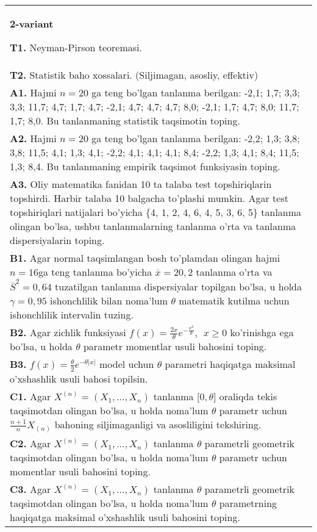 \documentclass{article}
\begin{document}
\begin{tabular}{m{17cm}}
\end{tabular}
\vspace{1cm}


\begin{tabular}{m{17cm}}
\textbf{2-variant}
\newline

\textbf{T1.} 
Neyman-Pirson teoremasi.
\\
\textbf{T2.} 
Statistik baho xossalari. (Siljimagan, asosliy, effektiv)
\\
\textbf{A1.} 
Hajmi \(n = 20\) ga teng bo'lgan tanlanma berilgan: -2,1; 1,7; 3,3; 3,3; 11,7; 4,7; 1,7; 4,7; -2,1; 4,7; 4,7; 4,7; 8,0; -2,1; 1,7; 4,7; 8,0; 11,7; 1,7; 8,0. Bu tanlanmaning statistik taqsimotin toping.
\\
\textbf{A2.} 
Hajmi \(n = 20\) ga teng bo'lgan tanlanma berilgan: -2,2; 1,3; 3,8; 3,8; 11,5; 4,1; 1,3; 4,1; -2,2; 4,1; 4,1; 4,1; 8,4; -2,2; 1,3; 4,1; 8,4; 11,5; 1,3; 8,4. Bu tanlanmaning empirik taqsimot funksiyasin toping.
\\
\textbf{A3.} 
Oliy matematika fanidan 10 ta talaba test topshiriqlarin topshirdi. Harbir talaba 10 balgacha to'plashi mumkin. Agar test topshiriqlari natijalari bo'yicha \{4, 1, 2, 4, 6, 4, 5, 3, 6, 5\} tanlanma olingan bo'lsa, ushbu tanlanmalarning tanlanma o'rta va tanlanma dispersiyalarin toping.
\\
\textbf{B1.} 
Agar normal taqsimlangan bosh to'plamdan olingan hajmi \(n = 16\)ga teng tanlanma bo'yicha \(\overline{x} = 20,2\) tanlanma o'rta va \({\overline{S}}^{2} = 0,64\) tuzatilgan tanlanma dispersiyalar topilgan bo'lsa, u holda \(\gamma = 0,95\) ishonchlilik bilan noma'lum \(\theta\) matematik kutilma uchun ishonchlilik intervalin tuzing.
\\
\textbf{B2.} 
Agar zichlik funksiyasi \(f(x) = \frac{2x}{\theta}e^{- \frac{x^{2}}{\theta}},\ \ x \geq 0\) ko'rinishga ega bo'lsa, u holda \(\theta\) parametr momentlar usuli bahosini toping.
\\
\textbf{B3.} 
\(f(x) = \frac{\theta}{2}e^{- \theta|x|}\) model uchun \(\theta\) parametri haqiqatga maksimal o'xshashlik usuli bahosi topilsin.
\\
\textbf{C1.} 
Agar \(X^{(n)} = \left( X_{1},...,X_{n} \right)\) tanlanma \(\lbrack 0,\theta\rbrack\) oraliqda tekis taqsimotdan olingan bo'lsa, u holda noma'lum \(\theta\) parametr uchun \(\frac{n + 1}{n}X_{(n)}\) bahoning siljimaganligi va asosliligini tekshiring.
\\
\textbf{C2.} 
Agar \(X^{(n)} = \left( X_{1},...,X_{n} \right)\) tanlanma \(\theta\) parametrli geometrik taqsimotdan olingan bo'lsa, u holda noma'lum \(\theta\) parametr uchun momentlar usuli bahosini toping.
\\
\textbf{C3.} 
Agar \(X^{(n)} = \left( X_{1},...,X_{n} \right)\) tanlanma \(\theta\) parametrli geometrik taqsimotdan olingan bo'lsa, u holda noma'lum \(\theta\) parametrning haqiqatga maksimal o'xshashlik usuli bahosini toping.
\\

\end{tabular}
\vspace{1cm}
\end{document}
